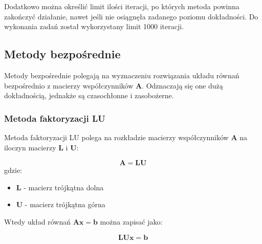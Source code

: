 \documentclass{article}
\begin{document}
Dodatkowo można określić limit ilości iteracji, po których metoda powinna zakończyć
działanie, nawet jeśli nie osiągnęła zadanego poziomu dokładności. Do wykonania zadań
został wykorzystany limit 1000 iteracji.

\subsection{Metody bezpośrednie}
Metody bezpośrednie polegają na wyznaczeniu rozwiązania układu równań
bezpośrednio z macierzy współczynników $\boldsymbol{A}$. Odznaczają się one
dużą dokładnością, jednakże są czasochłonne i zasobożerne.

\subsubsection{Metoda faktoryzacji LU}

Metoda faktoryzacji LU polega na rozkładzie macierzy 
współczynników $\boldsymbol{A}$
na iloczyn macierzy $\boldsymbol{L}$ i $\boldsymbol{U}$:

\begin{equation}
    \boldsymbol{A = LU}
\end{equation}
gdzie:
\begin{itemize}
    \item $\boldsymbol{L}$ - macierz trójkątna dolna
    \item $\boldsymbol{U}$ - macierz trójkątna górna
\end{itemize}

Wtedy układ równań $\boldsymbol{Ax = b}$ można zapisać jako:

\begin{equation*}
    \boldsymbol{LUx = b}
\end{equation*}
\end{document}
